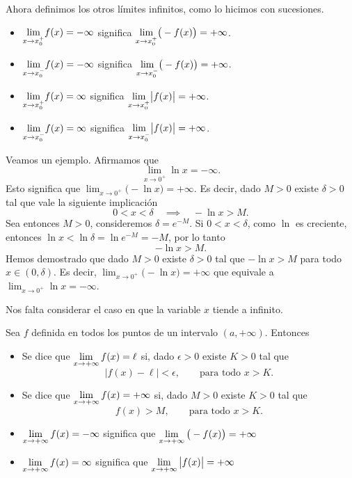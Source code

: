 Ahora definimos los otros límites infinitos, como lo hicimos con sucesiones.

\begin{definition}
\begin{itemize}
    \item $\displaystyle{\ensuremath{\lim_{x\to x_0^+}}} f(x) = -\infty$ significa $\displaystyle{\ensuremath{\lim_{x\to x_0^+}}} \big(-f(x)\big)=+\infty$.
    \item $\displaystyle{\ensuremath{\lim_{x\to x_0^-}}} f(x) = -\infty$ significa $\displaystyle{\ensuremath{\lim_{x\to x_0^-}}} \big(-f(x)\big)=+\infty$.
    \item $\displaystyle{\ensuremath{\lim_{x\to x_0^+}}} f(x) = \infty$ significa $\displaystyle{\ensuremath{\lim_{x\to x_0^+}}} \big|f(x)\big|=+\infty$.
    \item $\displaystyle{\ensuremath{\lim_{x\to x_0^-}}} f(x) = \infty$ significa $\displaystyle{\ensuremath{\lim_{x\to x_0^-}}} \big|f(x)\big|=+\infty$.
\end{itemize}
\end{definition}

\begin{example}
    Veamos un ejemplo. Afirmamos que
    \[
    \lim_{x\to 0^+} \ln x = -\infty.
    \]
    Esto significa que $\lim_{x\to 0^+} \big(-\ln x\big) = +\infty$. Es decir, dado $M>0$ existe $\delta>0$ tal que vale la siguiente implicación
    \[
    0<x<\delta \quad\implies\quad -\ln x > M.
    \]
    Sea entonces $M>0$, consideremos $\delta = e^{-M}$. Si $0<x<\delta$, como $\ln$ es creciente, entonces $\ln x<\ln \delta = \ln e^{-M} = -M$, por lo tanto
    \[
    -\ln x > M.
    \]
    Hemos demostrado que dado $M>0$ existe $\delta>0$ tal que $-\ln x > M$ para todo $x\in (0,\delta)$. Es decir, $\lim_{x\to 0^+} \big(-\ln x\big) = +\infty$ que equivale a $\lim_{x\to 0^+}\ln x=-\infty$.
\end{example}

Nos falta considerar el caso en que la variable $x$ tiende a infinito.

\begin{definition}
    Sea $f$ definida en todos los puntos de un intervalo $(a,+\infty)$. Entonces
    \begin{itemize}
        \item Se dice que $\displaystyle\lim_{x\to +\infty} f(x) = \ell$ si, dado $\epsilon>0$ existe $K>0$ tal que 
        \[
        |f(x)-\ell|<\epsilon,
        \qquad\text{para todo $x>K$}.
        \]
        \item Se dice que $\displaystyle\lim_{x\to +\infty} f(x) = +\infty$ si, dado $M>0$ existe $K>0$ tal que 
        \[
        f(x)>M,
        \qquad\text{para todo $x>K$}.
        \]
        \item $\displaystyle\lim_{x\to +\infty} f(x) = -\infty$ significa que $\displaystyle\lim_{x\to +\infty}\big(- f(x)\big) = +\infty$
        \item $\displaystyle\lim_{x\to +\infty} f(x) = \infty$ significa que $\displaystyle\lim_{x\to +\infty}\big|f(x)\big| = +\infty$
    \end{itemize}
\end{definition}


